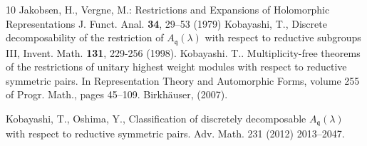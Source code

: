 \documentclass[12pt]{amsart}
\theoremstyle{definition}
\theoremstyle{remark}
\numberwithin{equation}{section}
\begin{document}
\begin{thebibliography}{10}
   Jakobsen, H., Vergne,  M.: Restrictions and Expansions of Holomorphic Representations J. Funct. Anal.\textbf{ 34}, 29--53 (1979)
   Kobayashi, T., Discrete decomposability of the restriction of $A_{\mathfrak q}(\lambda) $ with respect to reductive subgroups III, Invent. Math. {\bf 131}, 229-256 (1998).
      Kobayashi. T.. Multiplicity-free theorems of the restrictions of unitary highest weight modules with respect to reductive symmetric pairs. In Representation Theory and Automorphic Forms, volume 255 of Progr. Math., pages 45--109. Birkhäuser, (2007).

    Kobayashi, T., Oshima, Y., Classification of discretely decomposable $ A_\mathfrak q(\lambda)$ with respect to reductive symmetric pairs. Adv. Math. 231 (2012)  2013–2047.


\end{thebibliography}
\end{document}
